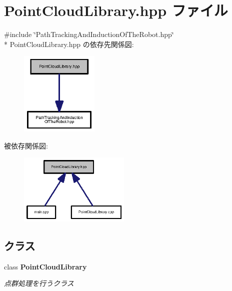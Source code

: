 \section{Point\-Cloud\-Library.\-hpp ファイル}
\label{_point_cloud_library_8hpp}
{\ttfamily \#include \char`\"{}Path\-Tracking\-And\-Induction\-Of\-The\-Robot.\-hpp\char`\"{}}\\*
Point\-Cloud\-Library.\-hpp の依存先関係図\-:\nopagebreak
\begin{figure}[H]
\begin{center}
\leavevmode
\includegraphics[width=106pt]{_point_cloud_library_8hpp__incl}
\end{center}
\end{figure}
被依存関係図\-:\nopagebreak
\begin{figure}[H]
\begin{center}
\leavevmode
\includegraphics[width=150pt]{_point_cloud_library_8hpp__dep__incl}
\end{center}
\end{figure}
\subsection*{クラス}
\begin{DoxyCompactItemize}
\item 
class {\bf Point\-Cloud\-Library}
\begin{DoxyCompactList}\small\item\em 点群処理を行うクラス \end{DoxyCompactList}\end{DoxyCompactItemize}
